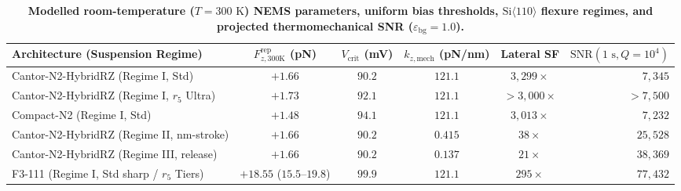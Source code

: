 \documentclass[11pt, a4paper]{article}
\begin{document}
\begin{table}[htbp]
\centering
\small
\caption{\textbf{Modelled room-temperature ($T=300\text{ K}$) NEMS parameters, uniform bias thresholds, $\mathrm{Si}\langle 110\rangle$ flexure regimes, and projected thermomechanical SNR ($\varepsilon_{\mathrm{bg}}=1.0$).}}
\label{tab:nems_feasibility}
\begin{tabular}{l c c c c r}
\toprule
Architecture (Suspension Regime) & $F_{z,300\mathrm{K}}^{\mathrm{rep}}$ (pN) & $V_{\mathrm{crit}}$ (mV) & $k_{z,\mathrm{mech}}$ (pN/nm) & Lateral SF & $\mathrm{SNR}(1\text{ s}, Q{=}10^4)$ \\
\midrule
Cantor-N2-HybridRZ (Regime I, Std) & $+1.66$ & $90.2$ & $121.1$ & $3{,}299\times$ & $7{,}345$ \\
Cantor-N2-HybridRZ (Regime I, $r_5$ Ultra) & $+1.73$ & $92.1$ & $121.1$ & $>3{,}000\times$ & $>7{,}500$ \\
Compact-N2 (Regime I, Std) & $+1.48$ & $94.1$ & $121.1$ & $3{,}013\times$ & $7{,}232$ \\
Cantor-N2-HybridRZ (Regime II, nm-stroke) & $+1.66$ & $90.2$ & $0.415$ & $38\times$ & $25{,}528$ \\
Cantor-N2-HybridRZ (Regime III, release) & $+1.66$ & $90.2$ & $0.137$ & $21\times$ & $38{,}369$ \\
F3-111 (Regime I, Std sharp / $r_5$ Tiers) & $+18.55$ ($15.5\text{--}19.8$) & $99.9$ & $121.1$ & $295\times$ & $77{,}432$ \\
\bottomrule
\end{tabular}
\end{table}
\end{document}
